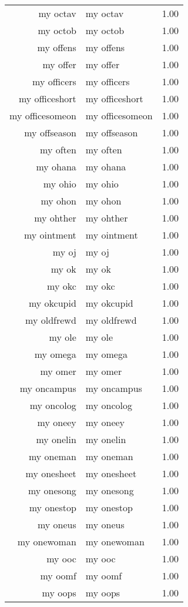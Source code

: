 \begin{table}[ht]
\begin{tabular}{rlr}
  my octav & my octav & 1.00 \\ 
  my octob & my octob & 1.00 \\ 
  my offens & my offens & 1.00 \\ 
  my offer & my offer & 1.00 \\ 
  my officers & my officers & 1.00 \\ 
  my officeshort & my officeshort & 1.00 \\ 
  my officesomeon & my officesomeon & 1.00 \\ 
  my offseason & my offseason & 1.00 \\ 
  my often & my often & 1.00 \\ 
  my ohana & my ohana & 1.00 \\ 
  my ohio & my ohio & 1.00 \\ 
  my ohon & my ohon & 1.00 \\ 
  my ohther & my ohther & 1.00 \\ 
  my ointment & my ointment & 1.00 \\ 
  my oj & my oj & 1.00 \\ 
  my ok & my ok & 1.00 \\ 
  my okc & my okc & 1.00 \\ 
  my okcupid & my okcupid & 1.00 \\ 
  my oldfrewd & my oldfrewd & 1.00 \\ 
  my ole & my ole & 1.00 \\ 
  my omega & my omega & 1.00 \\ 
  my omer & my omer & 1.00 \\ 
  my oncampus & my oncampus & 1.00 \\ 
  my oncolog & my oncolog & 1.00 \\ 
  my oneey & my oneey & 1.00 \\ 
  my onelin & my onelin & 1.00 \\ 
  my oneman & my oneman & 1.00 \\ 
  my onesheet & my onesheet & 1.00 \\ 
  my onesong & my onesong & 1.00 \\ 
  my onestop & my onestop & 1.00 \\ 
  my oneus & my oneus & 1.00 \\ 
  my onewoman & my onewoman & 1.00 \\ 
  my ooc & my ooc & 1.00 \\ 
  my oomf & my oomf & 1.00 \\ 
  my oops & my oops & 1.00 \\ 

\end{tabular}
\end{table}

